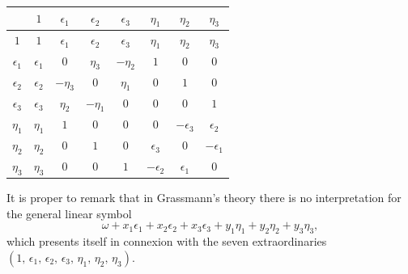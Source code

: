 \documentclass[12pt,a4paper]{article}
\theoremstyle{definition}
\begin{document}
\begin{center}
\begin{tabular}{|c|c||c|c|c||c|c|c|}
\hline
  & $1$ & $\epsilon_1$ & $\epsilon_2$ & $\epsilon_3$ & $\eta_1$ & $\eta_2$ & $\eta_3$ \\
\hline
\hline
$1$ & $1$ & $\epsilon_1$ & $\epsilon_2$ & $\epsilon_3$ & $\eta_1$ & $\eta_2$ & $\eta_3$ \\
\hline
$\epsilon_1$ & $\epsilon_1$ & $0$ & $\eta_3$ & $-\eta_2$ & $1$ & $0$ & $0$ \\
$\epsilon_2$ & $\epsilon_2$ & $-\eta_3$ & $0$ & $\eta_1$ & $0$ & $1$ & $0$ \\
$\epsilon_3$ & $\epsilon_3$ & $\eta_2$ & $-\eta_1$ & $0$ & $0$ & $0$ & $1$ \\
\hline
$\eta_1$ & $\eta_1$ & $1$ & $0$ & $0$ & $0$ & $-\epsilon_3$ & $\epsilon_2$ \\
$\eta_2$ & $\eta_2$ & $0$ & $1$ & $0$ & $\epsilon_3$ & $0$ & $-\epsilon_1$ \\
$\eta_3$ & $\eta_3$ & $0$ & $0$ & $1$ & $-\epsilon_2$ & $\epsilon_1$ & $0$ \\
\hline
\end{tabular}
\end{center}

It is proper to remark that in Grassmann's theory there is no interpretation for
the general linear symbol
\[
\omega + x_1 \epsilon_1 + x_2 \epsilon_2 + x_3 \epsilon_3
+ y_1 \eta_1 + y_2 \eta_2 + y_3 \eta_3,
\]
which presents itself in connexion with the seven extraordinaries
$(1,\, \epsilon_1,\, \epsilon_2,\, \epsilon_3,\, \eta_1,\, \eta_2,\, \eta_3)$.
\end{document}

